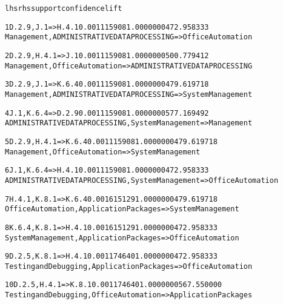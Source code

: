 \begin{alltt}\tiny
lhs                           rhs                support      confidence    lift

1   {D.2.9, J.1}           => {H.4.1}            0.001115908  1.0000000  472.958333
{Management, ADMINISTRATIVE DATA PROCESSING => Office Automation}

2   {D.2.9, H.4.1}         => {J.1}              0.001115908  1.0000000  500.779412
{Management, Office Automation => ADMINISTRATIVE DATA PROCESSING}

3   {D.2.9, J.1}           => {K.6.4}            0.001115908  1.0000000  479.619718
{Management, ADMINISTRATIVE DATA PROCESSING => System Management}

4   {J.1, K.6.4}           => {D.2.9}            0.001115908  1.0000000  577.169492
{ADMINISTRATIVE DATA PROCESSING, System Management => Management}

5   {D.2.9, H.4.1}         => {K.6.4}            0.001115908  1.0000000  479.619718
{Management, Office Automation => System Management}

6   {J.1, K.6.4}           => {H.4.1}            0.001115908  1.0000000  472.958333
{ADMINISTRATIVE DATA PROCESSING, System Management => Office Automation}

7   {H.4.1, K.8.1}         => {K.6.4}            0.001615129  1.0000000  479.619718
{Office Automation, Application Packages => System Management}

8   {K.6.4, K.8.1}         => {H.4.1}            0.001615129  1.0000000  472.958333
{System Management, Application Packages => Office Automation}

9   {D.2.5,K.8.1}          => {H.4.1}            0.001174640  1.0000000  472.958333
{Testing and Debugging, Application Packages => Office Automation}

10  {D.2.5, H.4.1}         => {K.8.1}            0.001174640  1.0000000  567.550000
{Testing and Debugging, Office Automation => Application Packages}
\end{alltt}
